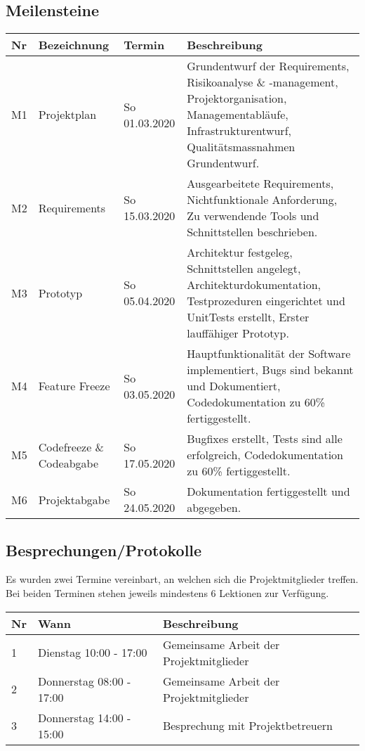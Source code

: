 \documentclass[
	ngerman,
	toc=listof, %
	toc=bibliography, %
	footnotes=multiple, %
	parskip=half, %
	numbers=noendperiod %
]{scrartcl}
\begin{document}
	\subsection{Meilensteine}
		\begin{tabularx}{0.9\linewidth}{lllX}
			\toprule
			Nr & Bezeichnung & Termin & Beschreibung \\
			\midrule
			M1 & Projektplan & So 01.03.2020 & Grundentwurf der Requirements, Risikoanalyse \& -management, Projektorganisation, Managementabläufe, Infrastrukturentwurf, Qualitätsmassnahmen Grundentwurf.\\
			\midrule
			M2 & Requirements & So 15.03.2020 & Ausgearbeitete Requirements, Nichtfunktionale Anforderung, Zu verwendende Tools und Schnittstellen beschrieben.\\
			\midrule 
			M3 & Prototyp & So 05.04.2020 & Architektur festgeleg, Schnittstellen angelegt, Architekturdokumentation, Testprozeduren eingerichtet und UnitTests erstellt, Erster lauffähiger Prototyp.\\
			\midrule
			M4 & Feature Freeze & So 03.05.2020 & Hauptfunktionalität der Software implementiert, Bugs sind bekannt und Dokumentiert, Codedokumentation zu 60\% fertiggestellt.\\
			\midrule
			M5 & Codefreeze \& Codeabgabe & So 17.05.2020 & Bugfixes erstellt, Tests sind alle erfolgreich, Codedokumentation zu 60\% fertiggestellt.\\
			\midrule
			M6 & Projektabgabe & So 24.05.2020 & Dokumentation fertiggestellt und abgegeben.\\
			\bottomrule
		\end{tabularx}

	\subsection{Besprechungen/Protokolle}
		Es wurden zwei Termine vereinbart, an welchen sich die Projektmitglieder treffen. 
		Bei beiden Terminen stehen jeweils mindestens 6 Lektionen zur Verfügung.

		\begin{tabularx}{0.9 \linewidth}{llX}
			\toprule
			Nr & Wann & Beschreibung \\
			\midrule
			1 & Dienstag 10:00 - 17:00 & Gemeinsame Arbeit der Projektmitglieder \\
			2 & Donnerstag 08:00 - 17:00 & Gemeinsame Arbeit der Projektmitglieder \\
			3 & Donnerstag 14:00 - 15:00 & Besprechung mit Projektbetreuern \\
			\bottomrule
		\end{tabularx}
\end{document}
